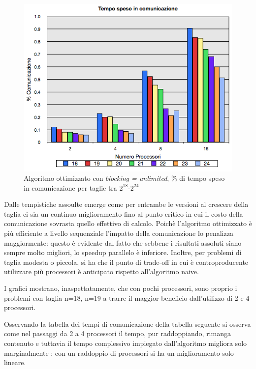 \documentclass[12pt,a4paper,oneside,openright]{article}
\begin{document}
\begin{figure}[H] 
  \centering
      \includegraphics[height=0.4\textheight]{immagini/comunicazione_ottimizzata_senza_rete}
 	  \caption{\textsf{Algoritmo ottimizzato} con \emph{blocking = unlimited}, \% di tempo speso in comunicazione per taglie tra $2^{18}$-$2^{24}$}
\end{figure}

Dalle tempistiche assoulte emerge come per entrambe le versioni al crescere della taglia ci sia un continuo miglioramento fino al punto critico in cui il costo della comunicazione sovrasta quello effettivo di calcolo. Poichè l'algoritmo ottimizzato è più efficiente a livello sequenziale l'impatto della comunicazione lo penalizza maggiormente: questo è evidente dal fatto che sebbene i risultati assoluti siano sempre molto migliori, lo speedup parallelo è inferiore. Inoltre, per problemi di taglia modesta o piccola, si ha che il punto di trade-off in cui è controproducente utilizzare più processori è anticipato rispetto all'algoritmo naive. 

I grafici mostrano, inaspettatamente, che con pochi processori, sono proprio i problemi con taglia n=18, n=19 a trarre il maggior beneficio dall'utilizzo di 2 e 4 processori.

Osservando la tabella dei tempi di comunicazione della tabella seguente si osserva come nel passaggi da 2 a 4 processori il tempo, pur raddoppiando, rimanga contenuto e tuttavia il tempo complessivo impiegato dall'algoritmo migliora solo marginalmente : con un raddoppio di processori si ha un miglioramento solo lineare.
\end{document}
